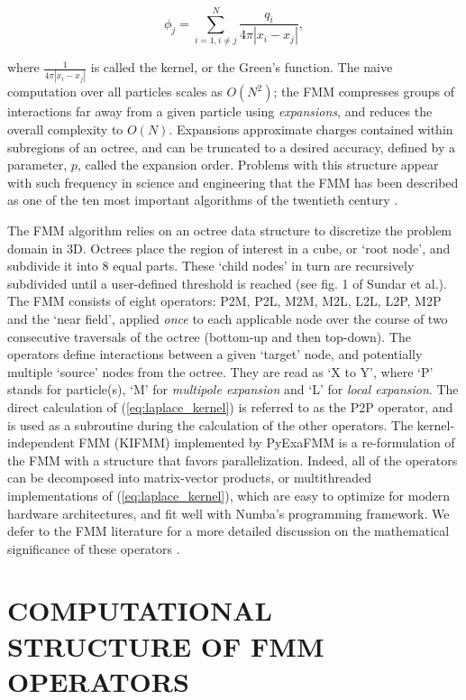 \documentclass{IEEEcsmag}
\begin{document}
\begin{equation}
    \phi_j = \sum_{i=1, i \neq j}^{N} \frac{q_i}{4 \pi| x_i-x_j |},
    \label{eq:laplace_kernel}
\end{equation}

\noindent where $\frac{1}{4 \pi| x_i-x_j|}$ is called the kernel, or the Green's function. The naive computation over all particles scales as $O(N^2)$; the FMM compresses groups of interactions far away from a given particle using \textit{expansions}, and reduces the overall complexity to $O(N)$. Expansions approximate charges contained within subregions of an octree, and can be truncated to a desired accuracy, defined by a parameter, $p$, called the expansion order. Problems with this structure appear with such frequency in science and engineering that the FMM has been described as one of the ten most important algorithms of the twentieth century \cite{Dongarra2000}.

The FMM algorithm relies on an octree data structure to discretize the problem domain in 3D. Octrees place the region of interest in a cube, or `root node', and subdivide it into 8 equal parts. These `child nodes' in turn are recursively subdivided until a user-defined threshold is reached (see fig. 1 of Sundar et al.\cite{Sundar2007}). The FMM consists of eight operators: P2M, P2L, M2M, M2L, L2L, L2P, M2P and the `near field', applied \textit{once} to each applicable node over the course of two consecutive traversals of the octree (bottom-up and then top-down). The operators define interactions between a given `target' node, and potentially multiple `source' nodes from the octree. They are read as `X to Y', where `P' stands for particle(s), `M' for \textit{multipole expansion} and `L' for \textit{local expansion}. The direct calculation of (\ref{eq:laplace_kernel}) is referred to as the P2P operator, and is used as a subroutine during the calculation of the other operators. The kernel-independent FMM (KIFMM) \cite{Ying2004} implemented by PyExaFMM is a re-formulation of the FMM with a structure that favors parallelization. Indeed, all of the operators can be decomposed into matrix-vector products, or multithreaded implementations of (\ref{eq:laplace_kernel}), which are easy to optimize for modern hardware architectures, and fit well with Numba's programming framework. We defer to the FMM literature for a more detailed discussion on the mathematical significance of these operators \cite{Ying2004,Greengard1987}.

\section{COMPUTATIONAL STRUCTURE OF FMM OPERATORS}
\end{document}

